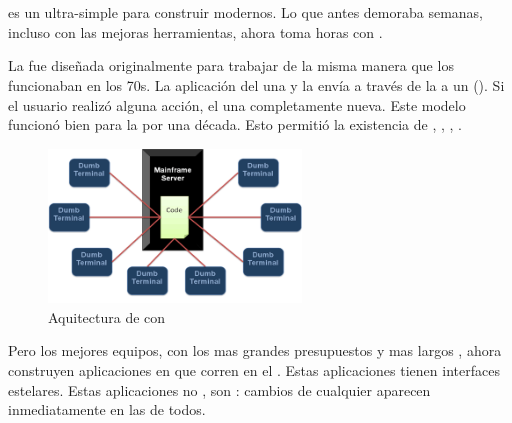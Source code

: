 
\section{\meteorNAME}


\meteorNAME es un \environmentPL ultra-simple para construir \websitesINT modernos. Lo que antes demoraba semanas, incluso con las mejoras herramientas, ahora toma horas con \meteorNAME.

La \webINT fue diseñada originalmente para trabajar de la misma manera que los \mainframesAS funcionaban en los 70s. La aplicación del \serverAS \rendered una \screen y la envía a través de la \networkINT a un \dumbterminal (). Si el usuario realizó alguna acción, el \serverAS \rendered una \screen completamente nueva. Este modelo funcionó bien para la \webINT por una década. Esto permitió la existencia de \lampNAME, \railsNAME, \djangoNAME, \phpNAME.

\begin{figure}[h!]
	\centering
	\includegraphics[width=0.6\textwidth]{figuras/mainframeServer_dumbterminal.png}
	\caption{Aquitectura de \mainframeAS con \dumbterminal}
	\label{figure:mainframeServer_dumbterminal}
\end{figure}


Pero los mejores equipos, con los mas grandes presupuestos y mas largos \schedules, ahora construyen aplicaciones en \javaScriptNAME que corren en el \clientAS. Estas aplicaciones tienen interfaces estelares. Estas aplicaciones no \reload \pages, son \reactive: cambios de cualquier \clientAS aparecen inmediatamente en las \screen de todos.


